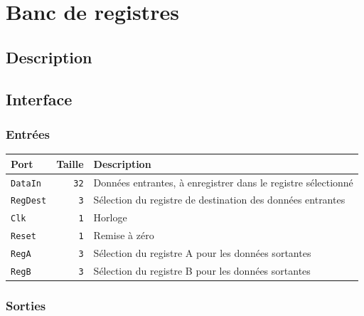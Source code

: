 \section{Banc de registres}

\subsection{Description}

\subsection{Interface}

\subsubsection{Entrées}

\begin{tabular}{|l|r|l|}
\hline
\textbf{Port}		& \textbf{Taille} & \textbf{Description}\\
\hline

\texttt{DataIn}		& \texttt{32} & Données entrantes, à enregistrer dans le registre sélectionné\\
\hline
\texttt{RegDest}	&  \texttt{3} & Sélection du registre de destination des données entrantes\\
\hline
\texttt{Clk}		&  \texttt{1} & Horloge\\
\hline
\texttt{Reset}		&  \texttt{1} & Remise à zéro\\
\hline
\texttt{RegA}		&  \texttt{3} & Sélection du registre A pour les données sortantes\\
\hline
\texttt{RegB}		&  \texttt{3} & Sélection du registre B pour les données sortantes\\

\hline
\end{tabular}


\subsubsection{Sorties}

